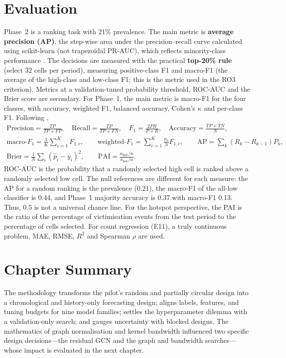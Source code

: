 \documentclass[11pt,a4paper]{report}
\begin{document}
\section{Evaluation}
Phase~2 is a ranking task with 21\% prevalence. The main metric is \textbf{average precision (AP)}, the step-wise area under the precision--recall curve calculated using scikit-learn (not trapezoidal PR-AUC), which reflects minority-class performance \citep{saito2015}. The decisions are measured with the practical \textbf{top-20\% rule} (select 32 cells per period), measuring positive-class F1 and macro-F1 (the average of the high-class and low-class F1; this is the metric used in the RO3 criterion). Metrics at a validation-tuned probability threshold, ROC-AUC and the Brier score are secondary. For Phase~1, the main metric is macro-F1 for the four classes, with accuracy, weighted F1, balanced accuracy, Cohen's $\kappa$ and per-class F1. Following \citet{sokolova2009},
\begin{gather}
\mathrm{Precision}=\frac{TP}{TP+FP},\quad \mathrm{Recall}=\frac{TP}{TP+FN},\quad F_1=\frac{2PR}{P+R},\quad \mathrm{Accuracy}=\frac{TP+TN}{N},\label{eq:prf}\\
\text{macro-}F_1=\frac{1}{K}\sum_{c=1}^{K}F_{1,c},\qquad \text{weighted-}F_1=\sum_{c=1}^{K}\frac{n_c}{N}F_{1,c},\qquad \mathrm{AP}=\sum_k (R_k-R_{k-1})P_k,\label{eq:macro}\\
\mathrm{Brier}=\frac{1}{N}\sum_{i}(\hat{p}_i-y_i)^2,\qquad \mathrm{PAI}=\frac{n_{\mathrm{hot}}/n}{a_{\mathrm{hot}}/a}.\label{eq:brier}
\end{gather}
ROC-AUC is the probability that a randomly selected high cell is ranked above a randomly selected low cell. The null references are different for each measure: the AP for a random ranking is the prevalence (0.21), the macro-F1 of the all-low classifier is 0.44, and Phase~1 majority accuracy is 0.37 with macro-F1 0.13. Thus, 0.5 is not a universal chance line. For the hotspot perspective, the PAI \citep{chainey2008} is the ratio of the percentage of victimisation events from the test period to the percentage of cells selected. For count regression (E11), a truly continuous problem, MAE, RMSE, $R^2$ and Spearman $\rho$ are used.

\section{Chapter Summary}
The methodology transforms the pilot's random and partially circular design into a chronological and history-only forecasting design; aligns labels, features, and tuning budgets for nine model families; settles the hyperparameter dilemma with a validation-only search; and gauges uncertainty with blocked designs. The mathematics of graph normalisation and kernel bandwidth influenced two specific design decisions---the residual GCN and the graph and bandwidth searches---whose impact is evaluated in the next chapter.
\end{document}
